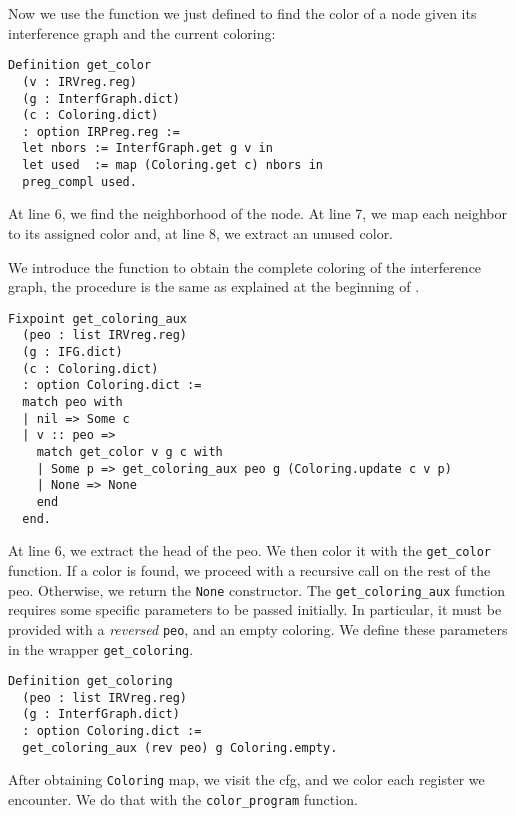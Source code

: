 Now we use the function we just defined to find the color of a node given its interference graph and the current coloring:

\begin{lstlisting}[style=Rocq]
Definition get_color
  (v : IRVreg.reg)
  (g : InterfGraph.dict)
  (c : Coloring.dict)
  : option IRPreg.reg :=
  let nbors := InterfGraph.get g v in
  let used  := map (Coloring.get c) nbors in
  preg_compl used.
\end{lstlisting}

At line 6, we find the neighborhood of the node. At line 7, we map each neighbor to its assigned color and, at line 8, we extract an unused color.

We introduce the function to obtain the complete coloring of the interference graph, the procedure is the same as explained at the beginning of .

\begin{lstlisting}[style=Rocq]
Fixpoint get_coloring_aux
  (peo : list IRVreg.reg)
  (g : IFG.dict)
  (c : Coloring.dict)
  : option Coloring.dict :=
  match peo with
  | nil => Some c
  | v :: peo =>
    match get_color v g c with
    | Some p => get_coloring_aux peo g (Coloring.update c v p)
    | None => None
    end
  end.
\end{lstlisting}

At line 6, we extract the head of the \gls{peo}. We then color it with the \texttt{get\_color} function. If a color is found, we proceed with a recursive call on the rest of the \gls{peo}. Otherwise, we return the \texttt{None} constructor.
The \texttt{get\_coloring\_aux} function requires some specific parameters to be passed initially. In particular, it must be provided with a \textit{reversed} \texttt{peo}, and an empty coloring. We define these parameters in the wrapper \texttt{get\_coloring}.

\begin{lstlisting}[style=Rocq]
Definition get_coloring
  (peo : list IRVreg.reg)
  (g : InterfGraph.dict)
  : option Coloring.dict :=
  get_coloring_aux (rev peo) g Coloring.empty.
\end{lstlisting}

After obtaining \texttt{Coloring} map, we visit the \gls{cfg}, and we color each register we encounter. We do that with the \texttt{color\_program} function.

